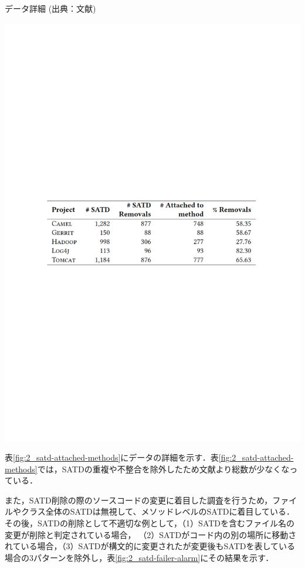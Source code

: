 \begin{table}[t]
    \centering
    \caption{データ詳細 (出典：文献\cite{satd-real-removal})}
    \includegraphics[width=0.9\linewidth, angle=0]{./thesis2/satd-attached-methods2.pdf}
    \label{fig:2_satd-attached-methods}
\end{table}

表\ref{fig:2_satd-attached-methods}にデータの詳細を示す．表\ref{fig:2_satd-attached-methods}では，SATDの重複や不整合を除外したため文献\cite{satd-removal}より総数が少なくなっている．

また，SATD削除の際のソースコードの変更に着目した調査を行うため，ファイルやクラス全体のSATDは無視して、メソッドレベルのSATDに着目している．
その後，SATDの削除として不適切な例として，（1）SATDを含むファイル名の変更が削除と判定されている場合， （2）SATDがコード内の別の場所に移動されている場合，（3）SATDが構文的に変更されたが変更後もSATDを表している場合の3パターンを除外し，表\ref{fig:2_satd-failer-alarm}にその結果を示す．

